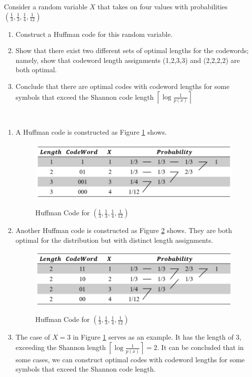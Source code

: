 \begin{exercise}{ Consider a random variable $X$ that takes on four values with probabilities $\left(\frac{1}{3}, \frac{1}{3}, \frac{1}{4}, \frac{1}{12}\right)$
  \begin{enumerate}
    \item Construct a Huffman code for this random variable.
    \item Show that there exist two different sets of optimal lengths for the codewords; namely, show that codeword length assignments (1,2,3,3) and (2,2,2,2) are both optimal.
    \item Conclude that there are optimal codes with codeword lengths for some symbols that exceed the Shannon code length $\left\lceil\log \frac{1}{p(x)}\right\rceil$
  \end{enumerate}
}
  \begin{solution}
  \par{~}
  \begin{enumerate}
    \item { A Huffman code is constructed as Figure \ref{fig:ex8-1} shows.
      \begin{figure}[H]
        \caption{Huffman Code for $\left(\frac{1}{3}, \frac{1}{3}, \frac{1}{4}, \frac{1}{12}\right)$}
        \centering
        \includegraphics[width=11cm]{img/5-3.png}
        \label{fig:ex8-1}
      \end{figure}
    }
    \item { Another Huffman code is constructed as Figure \ref{fig:ex8-2} shows. They are both optimal for the distribution but with distinct length assignments.
      \begin{figure}[H]
        \caption{Huffman Code for $\left(\frac{1}{3}, \frac{1}{3}, \frac{1}{4}, \frac{1}{12}\right)$}
        \centering
        \includegraphics[width=11cm]{img/5-4.png}
        \label{fig:ex8-2}
      \end{figure}
    }
    \item { The case of $X=3$ in Figure \ref{fig:ex8-1} serves as an example. It has the length of 3, exceeding the Shannon length  $\left\lceil\log \frac{1}{p(x)}\right\rceil = 2$. It can be concluded that in some cases, we can construct optimal codes with codeword lengths for some symbols that exceed the Shannon code length.
    }
  \end{enumerate}
  \end{solution}
  \label{ex5-8}
\end{exercise}


